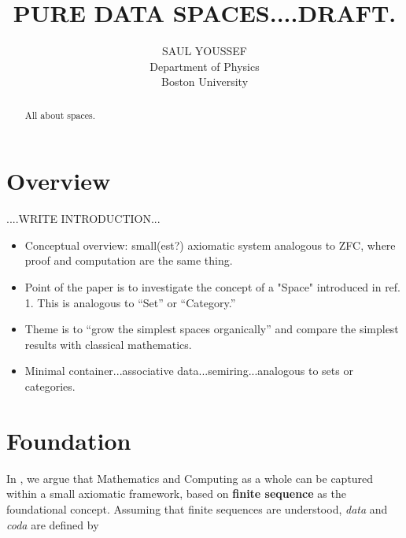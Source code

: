 \documentclass[11pt]{article}
\begin{document}
\title{\bf {PURE DATA SPACES....DRAFT.}}
\author{%
  SAUL YOUSSEF%
  \hfil \\
  Department of Physics \\
  Boston University \\
}
\maketitle
\begin{abstract}
All about spaces.
\end{abstract}

\theoremstyle{definition}
\newtheorem{axiom}{Axiom}
\newtheorem*{axiom*}{Axiom}
\newtheorem*{fact}{Fact}
\newtheorem{theorem}{Theorem}[section]
\newtheorem{lemma}{Lemma}
\newtheorem{corollary}[theorem]{Corollary}

\newtheorem{definition}{Definition}

\newtheorem*{remark}{}

\section{Overview}

....WRITE INTRODUCTION...

\begin{itemize}
\item Conceptual overview: small(est?) axiomatic system analogous to ZFC, where proof and computation are the same thing.
\item Point of the paper is to investigate the concept of a "Space" introduced in ref. 1.  This is analogous to ``Set'' or ``Category.''
\item Theme is to ``grow the simplest spaces organically'' and compare the simplest results with classical mathematics. 
\item Minimal container...associative data...semiring...analogous to sets or categories.
\end{itemize}

\section{Foundation}  

In \cite{PDF}, we argue that Mathematics and Computing as a whole can be captured within a small axiomatic framework, 
based on {\bf finite sequence} as the foundational concept.  Assuming that finite sequences are understood, {\it data} and {\it coda} are defined by 
\end{document}
